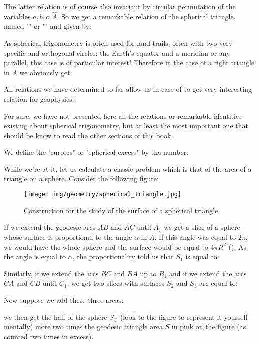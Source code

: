 	The latter relation is of course also invariant by circular permutation of the variables $a,b,c,\hat{A}$. So we get a remarkable relation of the spherical triangle, named "" or "" and given by:
	
	As spherical trigonometry is often used for land trails, often with two very specific and orthogonal circles: the Earth's equator and a meridian or any parallel, this case is of particular interest! Therefore in the case of a right triangle in $A$ we obviously get:
	
	All relations we have determined so far allow us in case of to get very interesting relation for geophysics:
	
	For sure, we have not presented here all the relations or remarkable identities existing about spherical trigonometry, but at least the most important one that should be know to read the other sections of this book.
	\begin{tcolorbox}[title=Remark,colframe=black,arc=10pt]
	We define the  "surplus" or "spherical excess" by the number:
	
	\end{tcolorbox}
	While we're at it, let us calculate a classic problem which is that of the area of a triangle on a sphere. Consider the following figure:
	\begin{figure}[H]
		\centering
		\texttt{[image: img/geometry/spherical\_triangle.jpg]}
		\caption[]{Construction for the study of the surface of a spherical triangle}
	\end{figure}
	If we extend the geodesic arcs $AB$ and $AC$ until $A_1$ we get a slice of a sphere whose surface is proportional to the angle $\alpha$ in $A$. If this angle was equal to $2\pi$, we would have the whole sphere and the surface would be equal to $4\pi R^2$ (). As the angle is equal to $\alpha$, the proportionality told us that $S_1$ is equal to:
	
	Similarly, if we extend the arcs $BC$ and $BA$ up to $B_1$ and if we extend the arcs $CA$ and $CB$ until $C_1$, we get two slices with surfaces $S_2$ and $S_3$ are equal to:
	
	Now suppose we add these three areas:
	
	we then get the half of the sphere $S_\odot$ (look to the figure to represent it yourself mentally) more two times the geodesic triangle area $S$ in pink on the figure (as counted two times in excess).
	
